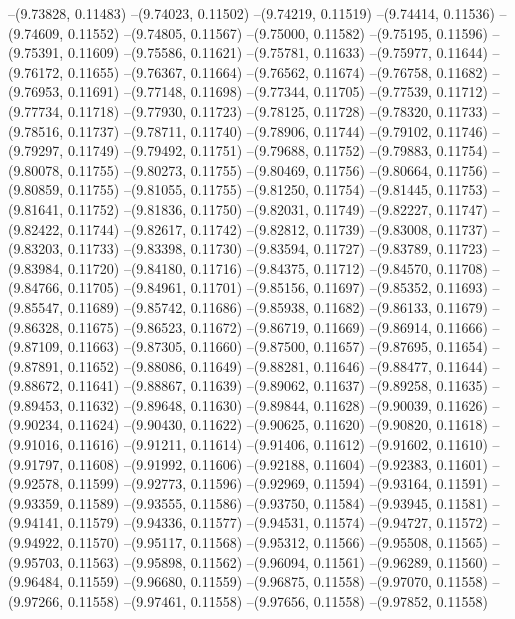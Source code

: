 --(9.73828, 0.11483)
--(9.74023, 0.11502)
--(9.74219, 0.11519)
--(9.74414, 0.11536)
--(9.74609, 0.11552)
--(9.74805, 0.11567)
--(9.75000, 0.11582)
--(9.75195, 0.11596)
--(9.75391, 0.11609)
--(9.75586, 0.11621)
--(9.75781, 0.11633)
--(9.75977, 0.11644)
--(9.76172, 0.11655)
--(9.76367, 0.11664)
--(9.76562, 0.11674)
--(9.76758, 0.11682)
--(9.76953, 0.11691)
--(9.77148, 0.11698)
--(9.77344, 0.11705)
--(9.77539, 0.11712)
--(9.77734, 0.11718)
--(9.77930, 0.11723)
--(9.78125, 0.11728)
--(9.78320, 0.11733)
--(9.78516, 0.11737)
--(9.78711, 0.11740)
--(9.78906, 0.11744)
--(9.79102, 0.11746)
--(9.79297, 0.11749)
--(9.79492, 0.11751)
--(9.79688, 0.11752)
--(9.79883, 0.11754)
--(9.80078, 0.11755)
--(9.80273, 0.11755)
--(9.80469, 0.11756)
--(9.80664, 0.11756)
--(9.80859, 0.11755)
--(9.81055, 0.11755)
--(9.81250, 0.11754)
--(9.81445, 0.11753)
--(9.81641, 0.11752)
--(9.81836, 0.11750)
--(9.82031, 0.11749)
--(9.82227, 0.11747)
--(9.82422, 0.11744)
--(9.82617, 0.11742)
--(9.82812, 0.11739)
--(9.83008, 0.11737)
--(9.83203, 0.11733)
--(9.83398, 0.11730)
--(9.83594, 0.11727)
--(9.83789, 0.11723)
--(9.83984, 0.11720)
--(9.84180, 0.11716)
--(9.84375, 0.11712)
--(9.84570, 0.11708)
--(9.84766, 0.11705)
--(9.84961, 0.11701)
--(9.85156, 0.11697)
--(9.85352, 0.11693)
--(9.85547, 0.11689)
--(9.85742, 0.11686)
--(9.85938, 0.11682)
--(9.86133, 0.11679)
--(9.86328, 0.11675)
--(9.86523, 0.11672)
--(9.86719, 0.11669)
--(9.86914, 0.11666)
--(9.87109, 0.11663)
--(9.87305, 0.11660)
--(9.87500, 0.11657)
--(9.87695, 0.11654)
--(9.87891, 0.11652)
--(9.88086, 0.11649)
--(9.88281, 0.11646)
--(9.88477, 0.11644)
--(9.88672, 0.11641)
--(9.88867, 0.11639)
--(9.89062, 0.11637)
--(9.89258, 0.11635)
--(9.89453, 0.11632)
--(9.89648, 0.11630)
--(9.89844, 0.11628)
--(9.90039, 0.11626)
--(9.90234, 0.11624)
--(9.90430, 0.11622)
--(9.90625, 0.11620)
--(9.90820, 0.11618)
--(9.91016, 0.11616)
--(9.91211, 0.11614)
--(9.91406, 0.11612)
--(9.91602, 0.11610)
--(9.91797, 0.11608)
--(9.91992, 0.11606)
--(9.92188, 0.11604)
--(9.92383, 0.11601)
--(9.92578, 0.11599)
--(9.92773, 0.11596)
--(9.92969, 0.11594)
--(9.93164, 0.11591)
--(9.93359, 0.11589)
--(9.93555, 0.11586)
--(9.93750, 0.11584)
--(9.93945, 0.11581)
--(9.94141, 0.11579)
--(9.94336, 0.11577)
--(9.94531, 0.11574)
--(9.94727, 0.11572)
--(9.94922, 0.11570)
--(9.95117, 0.11568)
--(9.95312, 0.11566)
--(9.95508, 0.11565)
--(9.95703, 0.11563)
--(9.95898, 0.11562)
--(9.96094, 0.11561)
--(9.96289, 0.11560)
--(9.96484, 0.11559)
--(9.96680, 0.11559)
--(9.96875, 0.11558)
--(9.97070, 0.11558)
--(9.97266, 0.11558)
--(9.97461, 0.11558)
--(9.97656, 0.11558)
--(9.97852, 0.11558)

